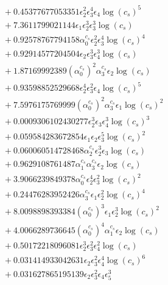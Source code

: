 \documentclass[10pt]{article}
\begin{document}
\begin{align*}
&{}  + 0.45377677053351 \epsilon_{2}^{2} \epsilon_{3}^{4} \epsilon_{4} \log{\left(c_{s} \right)}^{5} \\
&{}  + 7.3611799021144 \epsilon_{1} \epsilon_{2}^{3} \epsilon_{3}^{3} \log{\left(c_{s} \right)} \\
&{}  + 0.92578767794158 \alpha_{0}^{c_s} \epsilon_{2}^{2} \epsilon_{3}^{4} \log{\left(c_{s} \right)}^{4} \\
&{}  + 0.92914577204504 \epsilon_{2} \epsilon_{3}^{3} \epsilon_{4}^{3} \log{\left(c_{s} \right)} \\
&{}  + 1.87169992389 \left(\alpha_{0}^{c_s}\right)^{2} \alpha_{3}^{c_s} \epsilon_{2} \log{\left(c_{s} \right)} \\
&{}  + 0.93598852529668 \epsilon_{2}^{4} \epsilon_{3}^{2} \epsilon_{4} \log{\left(c_{s} \right)}^{5} \\
&{}  + 7.5976175769999 \left(\alpha_{0}^{c_s}\right)^{2} \alpha_{3}^{c_s} \epsilon_{1} \log{\left(c_{s} \right)}^{2} \\
&{}  + 0.0009306102430277 \epsilon_{2}^{3} \epsilon_{3} \epsilon_{4}^{3} \log{\left(c_{s} \right)}^{3} \\
&{}  + 0.059584283672854 \epsilon_{1} \epsilon_{2} \epsilon_{3}^{5} \log{\left(c_{s} \right)}^{2} \\
&{}  + 0.060060514728468 \alpha_{2}^{c_s} \epsilon_{2}^{3} \epsilon_{3} \log{\left(c_{s} \right)} \\
&{}  + 0.9629108761487 \alpha_{1}^{c_s} \alpha_{3}^{c_s} \epsilon_{2} \log{\left(c_{s} \right)} \\
&{}  + 3.9066239849378 \alpha_{0}^{c_s} \epsilon_{2}^{4} \epsilon_{3}^{2} \log{\left(c_{s} \right)}^{2} \\
&{}  + 0.24476283952426 \alpha_{3}^{c_s} \epsilon_{1} \epsilon_{2}^{2} \log{\left(c_{s} \right)}^{4} \\
&{}  + 8.0098898393384 \left(\alpha_{0}^{c_s}\right)^{3} \epsilon_{1} \epsilon_{2}^{3} \log{\left(c_{s} \right)}^{2} \\
&{}  + 4.0066289736645 \left(\alpha_{0}^{c_s}\right)^{4} \alpha_{1}^{c_s} \epsilon_{2} \log{\left(c_{s} \right)} \\
&{}  + 0.50172218096081 \epsilon_{2}^{3} \epsilon_{3}^{2} \epsilon_{4}^{2} \log{\left(c_{s} \right)} \\
&{}  + 0.031414933042631 \epsilon_{2} \epsilon_{3}^{2} \epsilon_{4}^{4} \log{\left(c_{s} \right)}^{6} \\
&{}  + 0.031627865195139 \epsilon_{2} \epsilon_{3}^{2} \epsilon_{4} \epsilon_{5}^{3} \\

\end{align*}
\end{document}
